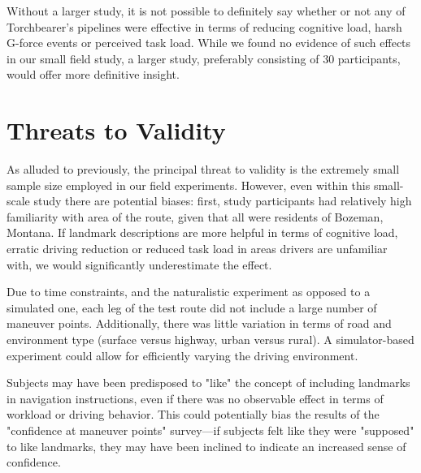 Without a larger study, it is not possible to definitely say whether or not any of Torchbearer's pipelines were effective in terms of reducing cognitive load, harsh G-force events or perceived task load. While we found no evidence of such effects in our small field study, a larger study, preferably consisting of 30 participants, would offer more definitive insight.

\section{Threats to Validity}

As alluded to previously, the principal threat to validity is the extremely small sample size employed in our field experiments. However, even within this small-scale study there are potential biases: first, study participants had relatively high familiarity with area of the route, given that all were residents of Bozeman, Montana. If landmark descriptions are more helpful in terms of cognitive load, erratic driving reduction or reduced task load in areas drivers are unfamiliar with, we would significantly underestimate the effect.

Due to time constraints, and the naturalistic experiment as opposed to a simulated one, each leg of the test route did not include a large number of maneuver points. Additionally, there was little variation in terms of road and environment type (surface versus highway, urban versus rural). A simulator-based experiment could allow for efficiently varying the driving environment.

Subjects may have been predisposed to "like" the concept of including landmarks in navigation instructions, even if there was no observable effect in terms of workload or driving behavior. This could potentially bias the results of the "confidence at maneuver points" survey---if subjects felt like they were "supposed" to like landmarks, they may have been inclined to indicate an increased sense of confidence.